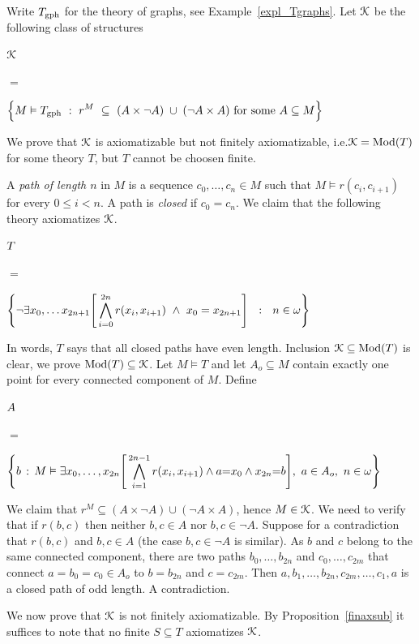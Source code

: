 \documentclass[creche.tex]{subfiles}
\begin{document}
\begin{example}

\def\ceq#1#2#3{\parbox{5ex}{$\displaystyle #1$}\parbox{4ex}{\hfil$#2$}$\displaystyle #3$}

Write $T_{\rm gph}$ for the theory of graphs, see Example~\ref{expl_Tgraphs}. Let $\EuScript K$ be the following class of structures


\ceq{\hfill \K}{=}{\Big\{M\models T_{\rm gph}\ :\ r^M\ \subseteq\ (A\times \neg A)\;\cup\;(\neg A\times A)\textrm{ for some }A\subseteq M\Big\}}


We prove that $\EuScript K$ is axiomatizable but not finitely axiomatizable, i.e.\@ $\EuScript K=\mathop{\rm Mod}(T)$ for some theory $T$, but $T$ cannot be choosen finite.

A \emph{path of length $n$\/} in $M$ is a sequence $c_0,\dots,c_n\in M$ such that $M\models r(c_i,c_{i+1})$ for every $0\le i<n$. A path is \emph{closed\/} if $c_0=c_n$.  We claim that the following theory axiomatizes $\EuScript K$.


\ceq{\hfill T}{=}{\Bigg\{\neg\E x_0,\dots x_{2n+1} \Bigg[\bigwedge^{2n}_{i=0} r(x_i,x_{i+1})\ \wedge\ x_0=x_{2n+1} \Bigg]\ \ :\ \ n\in\omega\Bigg\}}

In words, $T$ says that all closed paths have even length. Inclusion $\EuScript K\subseteq\mathop{\rm Mod}(T)$ is clear, we prove $\mathop{\rm Mod}(T)\subseteq\EuScript K$. Let $M\models T$ and let $A_o\subseteq M$ contain exactly one point for every connected component of $M$. Define 

\ceq{\hfill A}{=}{\Bigg\{b\, :\, M\models\E x_0,\dots, x_{2n} \Bigg[\bigwedge^{2n-1}_{i=1} r(x_i,x_{i+1}) \wedge a{=}x_0\wedge x_{2n}{=}b\Bigg],\ a\in A_o,\ n\in\omega\Bigg\}}

We claim that $r^M\subseteq(A\times \neg A)\cup(\neg A\times A)$, hence $M\in\EuScript K$. We need to verify that if $r(b,c)$ then neither $b,c\in A$ nor $b,c\in\neg A$.  Suppose for a contradiction that $r(b,c)$ and $b,c\in A$ (the case $b,c\in\neg A$ is similar). As $b$ and $c$ belong to the same connected component, there are two paths $b_0,\dots,b_{2n}$ and $c_0,\dots,c_{2m}$ that connect $a=b_0=c_0\in A_o$ to $b=b_{2n}$ and $c=c_{2m}$. Then $a,b_1,\dots,b_{2n},c_{2m},\dots,c_1,a$ is a closed path of odd length. A contradiction.

We now prove that $\EuScript K$ is not finitely axiomatizable. By Proposition~\ref{finaxsub} it suffices to note that no finite $S\subseteq T$ axiomatizes $\EuScript K$.\QED
\end{example}




% 
% 
\end{document}
